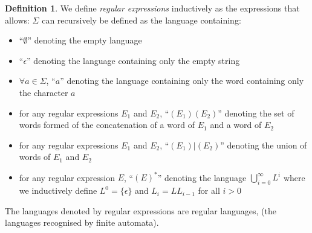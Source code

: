 \documentclass[12px]{article}
\theoremstyle{definition}
\newtheorem{definition}{Definition}
\begin{document}
        \begin{definition}
          We define \emph{regular expressions} inductively as the expressions
          that allows:
          $\Sigma$ can recursively be defined as the language containing:
            \begin{itemize}
              \item ``$\emptyset$'' denoting the empty language
              \item ``$\epsilon$'' denoting the language containing only the
                empty string
              \item $\forall a \in \Sigma$, ``$a$'' denoting the language
                containing only the word containing only the character $a$
              \item for any regular expressions $E_1$ and $E_2$, ``$(E_1)
                (E_2)$'' denoting the set of words formed of the concatenation
                of a word of $E_1$ and a word of $E_2$
              \item for any regular expressions $E_1$ and $E_2$,
                ``$(E_1)|(E_2)$'' denoting the union of words of $E_1$ and
                $E_2$
              \item for any regular expression $E$, ``${(E)}^*$'' denoting the
                language $\bigcup\limits_{i = 0}^\infty L^i$ where we
                inductively define $L^0 = \{\epsilon\}$ and $L_i = L L_{i-1}$
                for all $i > 0$
            \end{itemize}

          The languages denoted by regular expressions are regular languages,
          (the languages recognised by finite automata).
        \end{definition}
\end{document}
